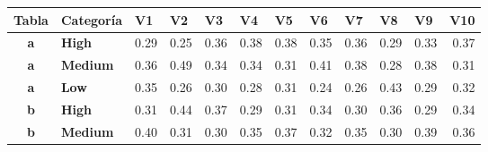 \documentclass[mathematics,article,submit,moreauthors,pdftex]{mdpi}
\begin{document}
\begin{table}[H]
\centering
\begin{tabular}{@{}clrrrrrrrrrr@{}}
\toprule
\textbf{Tabla} & \textbf{Categoría} & \multicolumn{1}{l}{\textbf{V1}} & \multicolumn{1}{l}{\textbf{V2}} & \multicolumn{1}{l}{\textbf{V3}} & \multicolumn{1}{l}{\textbf{V4}} & \multicolumn{1}{l}{\textbf{V5}} & \multicolumn{1}{l}{\textbf{V6}} & \multicolumn{1}{l}{\textbf{V7}} & \multicolumn{1}{l}{\textbf{V8}} & \multicolumn{1}{l}{\textbf{V9}} & \multicolumn{1}{l}{\textbf{V10}} \\ \midrule
\rowcolor[HTML]{D9D9D9} 
\textbf{a}     & \textbf{High}      & 0.29                               & 0.25                               & 0.36                               & 0.38                               & 0.38                               & 0.35                               & 0.36                               & 0.29                               & 0.33                               & 0.37                                \\
\rowcolor[HTML]{D9D9D9} 
\textbf{a}     & \textbf{Medium}    & 0.36                               & 0.49                               & 0.34                               & 0.34                               & 0.31                               & 0.41                               & 0.38                               & 0.28                               & 0.38                               & 0.31                                \\
\rowcolor[HTML]{D9D9D9} 
\textbf{a}     & \textbf{Low}       & 0.35                               & 0.26                               & 0.30                               & 0.28                               & 0.31                               & 0.24                               & 0.26                               & 0.43                               & 0.29                               & 0.32                                \\
\textbf{b}     & \textbf{High}      & 0.31                               & 0.44                               & 0.37                               & 0.29                               & 0.31                               & 0.34                               & 0.30                               & 0.36                               & 0.29                               & 0.34                                \\
\textbf{b}     & \textbf{Medium}    & 0.40                               & 0.31                               & 0.30                               & 0.35                               & 0.37                               & 0.32                               & 0.35                               & 0.30                               & 0.39                               & 0.36                                \\

\end{tabular}
\end{table}
\end{document}

